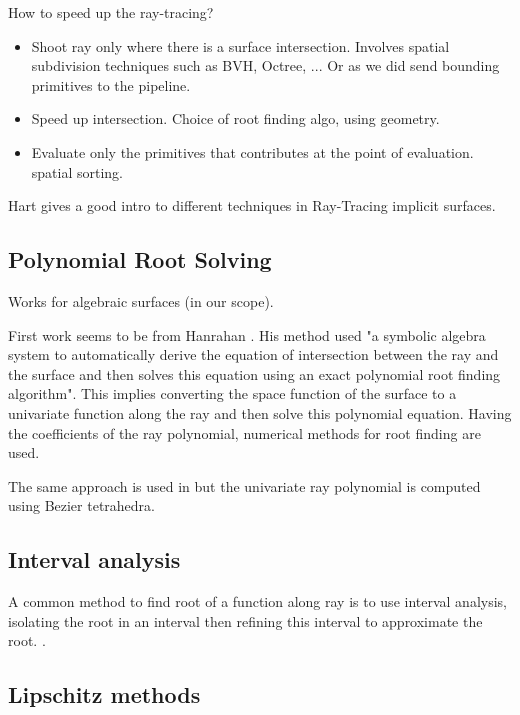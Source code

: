 \documentclass[11pt]{article}
\numberwithin{figure}{section}
\begin{document}
How to speed up the ray-tracing?

\begin{itemize}

\item{} Shoot ray only where there is a surface intersection. Involves spatial subdivision techniques such as BVH, Octree, ... Or as we did send bounding primitives to the pipeline.
\item Speed up intersection. Choice of root finding algo, using geometry.
\item Evaluate only the primitives that contributes at the point of evaluation. spatial sorting.

\end{itemize}


Hart gives a good intro to different techniques in Ray-Tracing implicit surfaces.

\subsection{Polynomial Root Solving}

Works for algebraic surfaces (in our scope).

First work seems to be from Hanrahan \cite{Hanrahan:1983:RTA:800059.801136}. His method used "a symbolic
algebra system to automatically derive the
equation of intersection between the ray
and the surface and then solves this equation
using an exact polynomial root finding
algorithm". This implies converting the space function of the surface to a univariate function along the ray and then solve this polynomial equation.
Having the coefficients of the ray polynomial, numerical methods for root finding are used.

The same approach is used in \cite{Loop:2006:RGR:1179352.1141939} but the univariate ray polynomial is computed using Bezier tetrahedra.

\subsection{Interval analysis}

A common method to find root of a function along ray is to use interval analysis, isolating the root in an interval then refining this interval to approximate the root. \cite{Mitchell:1990:RRI:93267.93276}.

\subsection{Lipschitz methods}
\end{document}
